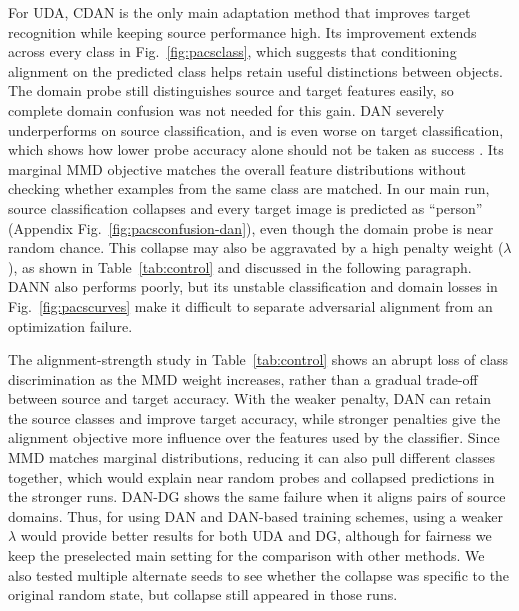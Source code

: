 \documentclass{article}
\begin{document}
For UDA, CDAN is the only main adaptation method that improves target recognition while keeping source performance high. Its improvement extends across every class in Fig.~\ref{fig:pacsclass}, which suggests that conditioning alignment on the predicted class helps retain useful distinctions between objects. The domain probe still distinguishes source and target features easily, so complete domain confusion was not needed for this gain. DAN severely underperforms on source classification, and is even worse on target classification, which shows how lower probe accuracy alone should not be taken as success \citep{zhao2019invariant}. Its marginal MMD objective matches the overall feature distributions without checking whether examples from the same class are matched. In our main run, source classification collapses and every target image is predicted as ``person'' (Appendix Fig.~\ref{fig:pacsconfusion-dan}), even though the domain probe is near random chance. This collapse may also be aggravated by a high penalty weight ($\lambda$), as shown in Table~\ref{tab:control} and discussed in the following paragraph. DANN also performs poorly, but its unstable classification and domain losses in Fig.~\ref{fig:pacscurves} make it difficult to separate adversarial alignment from an optimization failure.

The alignment-strength study in Table~\ref{tab:control} shows an abrupt loss of class discrimination as the MMD weight increases, rather than a gradual trade-off between source and target accuracy. With the weaker penalty, DAN can retain the source classes and improve target accuracy, while stronger penalties give the alignment objective more influence over the features used by the classifier. Since MMD matches marginal distributions, reducing it can also pull different classes together, which would explain near random probes and collapsed predictions in the stronger runs. DAN-DG shows the same failure when it aligns pairs of source domains. Thus, for using DAN and DAN-based training schemes, using a weaker $\lambda$ would provide better results for both UDA and DG, although for fairness we keep the preselected main setting for the comparison with other methods. We also tested multiple alternate seeds to see whether the collapse was specific to the original random state, but collapse still appeared in those runs.
\end{document}

